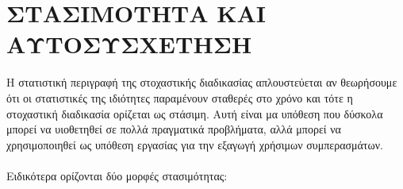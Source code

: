 
\section{ ΣΤΑΣΙΜΟΤΗΤΑ ΚΑΙ ΑΥΤΟΣΥΣΧΕΤΗΣΗ}
Η στατιστική περιγραφή της στοχαστικής διαδικασίας απλουστεύεται αν
θεωρήσουμε ότι οι στατιστικές της ιδιότητες παραμένουν σταθερές στο χρόνο και
τότε η στοχαστική διαδικασία ορίζεται ως στάσιμη. Αυτή είναι μα υπόθεση που
δύσκολα μπορεί να υιοθετηθεί σε πολλά πραγματικά προβλήματα, αλλά μπορεί να
χρησιμοποιηθεί ως υπόθεση εργασίας για την εξαγωγή χρήσιμων συμπερασμάτων.\\ \\
Ειδικότερα ορίζονται δύο μορφές στασιμότητας:\\



